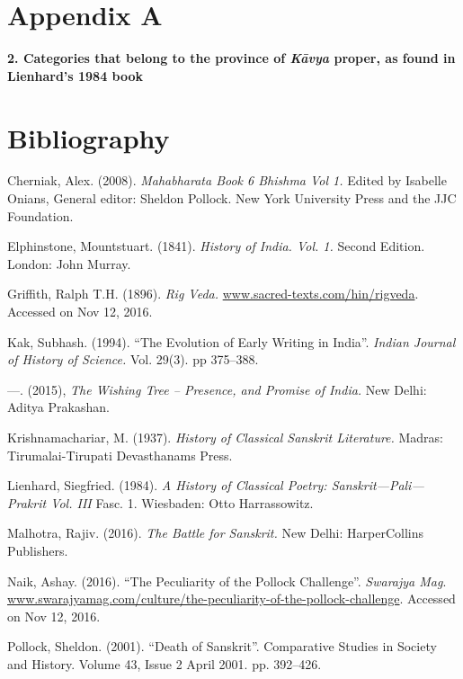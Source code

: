 \section*{Appendix A}

\textbf{2. Categories that belong to the province of \textit{Kāvya} proper, as found in Lienhard’s 1984 book}


\section*{Bibliography}

\begin{thebibliography}{99}
 Cherniak, Alex. (2008). \textit{Mahabharata Book 6 Bhishma Vol 1.} Edited by Isabelle Onians, General editor: Sheldon Pollock. New York University Press and the JJC Foundation.

  Elphinstone, Mountstuart. (1841). \textit{History of India. Vol. 1.} Second Edition. London: John Murray.

  Griffith, Ralph T.H. (1896). \textit{Rig Veda.} \url{www.sacred-texts.com/hin/rigveda}. Accessed on Nov 12, 2016.

  Kak, Subhash. (1994). “The Evolution of Early Writing in India”. \textit{Indian Journal of History of Science.} Vol. 29(3). pp 375–388.

  —. (2015), \textit{The Wishing Tree – Presence, and Promise of India.} New Delhi: Aditya Prakashan.

  Krishnamachariar, M. (1937). \textit{History of Classical Sanskrit Literature.} Madras: Tirumalai-Tirupati Devasthanams Press.

  Lienhard, Siegfried. (1984). \textit{A History of Classical Poetry: Sanskrit—Pali—Prakrit Vol. III} Fasc. 1. Wiesbaden: Otto Harrassowitz.

  Malhotra, Rajiv. (2016). \textit{The Battle for Sanskrit.} New Delhi: HarperCollins Publishers.

  Naik, Ashay. (2016). “The Peculiarity of the Pollock Challenge”. \textit{Swarajya Mag}. \url{www.swarajyamag.com/culture/the-peculiarity-of-the-pollock-challenge}. Accessed on Nov 12, 2016.

  Pollock, Sheldon. (2001). “Death of Sanskrit”. Comparative Studies in Society and History. Volume 43, Issue 2 April 2001. pp. 392–426. 


\end{thebibliography}
